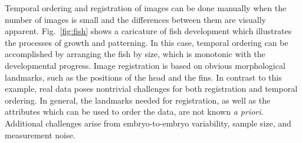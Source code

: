 \documentclass[twocolumn, 10pt]{article}
\makeatletter
\newcommand{\fig}[0]{Fig.}
\newcommand{\customlabel}[2]{%
\protected@write \@auxout {}{\string \newlabel {#1}{{#2}{}}}}
\makeatother
\begin{document}
Temporal ordering and registration of images can be done manually
when the number of images is small and the differences between them are visually apparent. 
%
\fig~\ref{fig:fish} shows a caricature of fish development which illustrates the processes of growth and patterning.
%
In this case, temporal ordering can be accomplished by arranging the fish by size, which is monotonic with the developmental progress.
%
Image registration is based on obvious morphological landmarks, such as the positions of the head and the fins.
%
In contrast to this example, real data poses nontrivial challenges for both registration and temporal ordering.
%
In general, the landmarks needed for registration, as well as the attributes which can be used to order the data, are not known {\it a priori}.
%
Additional challenges arise from embryo-to-embryo variability, sample size, and measurement noise.


\end{document}
